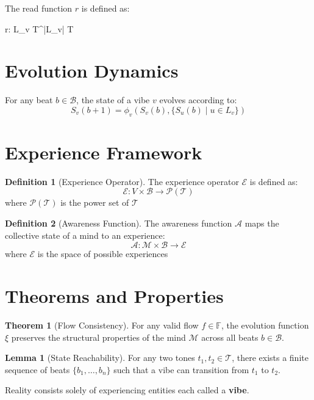 \documentclass{article}
\let\oldequation\equation
\let\endoldequation\endequation
\renewenvironment{equation}{%
    \noindent\vspace{-\parskip}\vspace{-\baselineskip}%
    \oldequation
}{%
    \endoldequation
    \noindent\vspace{-\parskip}\vspace{-\baselineskip}%
}
\theoremstyle{definition}
\theoremstyle{axiom}
\theoremstyle{theorem}
\theoremstyle{lemma}
\theoremstyle{proposition}
\newtheorem{definition}{Definition}      %
\newtheorem{theorem}{Theorem}
\newtheorem{lemma}{Lemma}
\begin{document}
The read function $r$ is defined as:

\begin{equation}
    r: L_v \times T^{|L_v|} \rightarrow T
\end{equation}

\section{Evolution Dynamics}

For any beat $b \in \mathcal{B}$, the state of a vibe $v$ evolves according to:
\[ S_v(b+1) = \phi_v(S_v(b), \{S_u(b) \mid u \in L_v\}) \]

\section{Experience Framework}

\begin{definition}[Experience Operator]
The experience operator $\mathcal{E}$ is defined as:
\[ \mathcal{E}: V \times \mathcal{B} \rightarrow \mathcal{P}(\mathcal{T}) \]
where $\mathcal{P}(\mathcal{T})$ is the power set of $\mathcal{T}$
\end{definition}

\begin{definition}[Awareness Function]
The awareness function $\mathcal{A}$ maps the collective state of a mind to an experience:
\[ \mathcal{A}: \mathcal{M} \times \mathcal{B} \rightarrow \mathcal{E} \]
where $\mathcal{E}$ is the space of possible experiences
\end{definition}

\section{Theorems and Properties}

\begin{theorem}[Flow Consistency]
For any valid flow $f \in \mathbb{F}$, the evolution function $\xi$ preserves the structural properties of the mind $\mathcal{M}$ across all beats $b \in \mathcal{B}$.
\end{theorem}

\begin{lemma}[State Reachability]
For any two tones $t_1, t_2 \in \mathcal{T}$, there exists a finite sequence of beats $\{b_1, \ldots, b_n\}$ such that a vibe can transition from $t_1$ to $t_2$.
\end{lemma}

Reality consists solely of experiencing entities each called a \textbf{vibe}.
\end{document}
